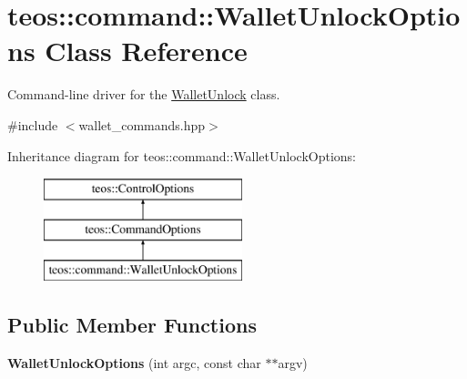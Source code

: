 \hypertarget{classteos_1_1command_1_1_wallet_unlock_options}{}\section{teos\+:\+:command\+:\+:Wallet\+Unlock\+Options Class Reference}
\label{classteos_1_1command_1_1_wallet_unlock_options}


Command-\/line driver for the \mbox{\hyperlink{classteos_1_1command_1_1_wallet_unlock}{Wallet\+Unlock}} class.  




{\ttfamily \#include $<$wallet\+\_\+commands.\+hpp$>$}

Inheritance diagram for teos\+:\+:command\+:\+:Wallet\+Unlock\+Options\+:\begin{figure}[H]
\begin{center}
\leavevmode
\includegraphics[height=3.000000cm]{classteos_1_1command_1_1_wallet_unlock_options}
\end{center}
\end{figure}
\subsection*{Public Member Functions}
\begin{DoxyCompactItemize}
\item 
\mbox{\label{classteos_1_1command_1_1_wallet_unlock_options_a2b5254389e6bac32bd88a30ee6f92d78}} 
{\bfseries Wallet\+Unlock\+Options} (int argc, const char $\ast$$\ast$argv)
\end{DoxyCompactItemize}
